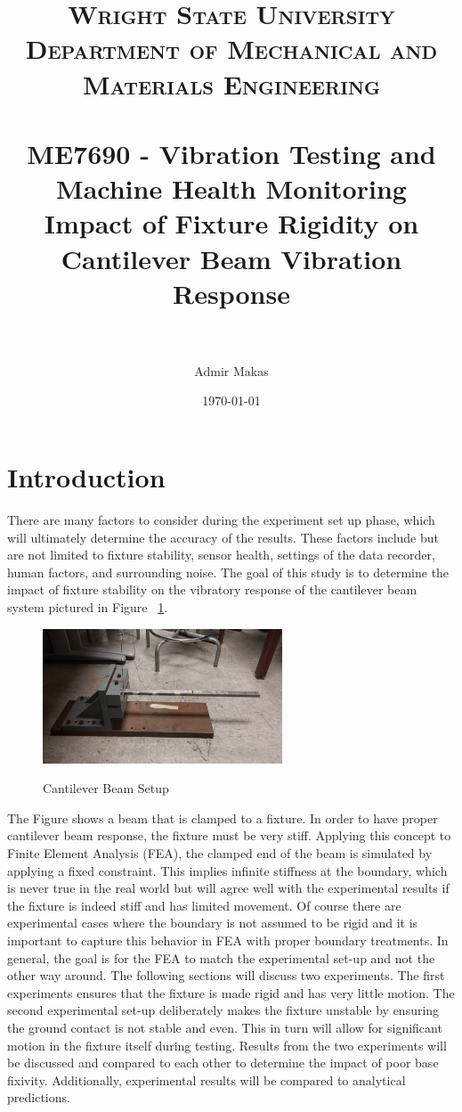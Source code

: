 \documentclass[paper=a4, fontsize=12pt]{scrartcl} %
\title{	
\normalfont \normalsize 
\textsc{Wright State University\\ Department of Mechanical and Materials Engineering} \\ [25pt] %
\horrule{0.5pt} \\[0.4cm] %
\large ME7690 - Vibration Testing and Machine Health Monitoring \\ %
\huge Impact of Fixture Rigidity on Cantilever Beam Vibration Response\\
\horrule{2pt} \\[0.4cm] %
}
\author{Admir Makas} %
\date{\normalsize\today} %
\begin{document}
\maketitle %

\section*{Introduction}
There are many factors to consider during the experiment set up phase, which will ultimately determine the accuracy of the results. These factors include but are not limited to fixture stability, sensor health, settings of the data recorder, human factors, and surrounding noise. The goal of this study is to determine the impact of fixture stability on the vibratory response of the cantilever beam system pictured in Figure ~\ref{fig:beamSideProfile}.
%
	\begin{figure}[H]
		\centering
		{
		\includegraphics[height=4.0cm]{BeamSideProfile.jpg}
		\label{fig:beamSideProfile}
		}
		\caption{Cantilever Beam Setup}
	\end{figure}
%
The Figure shows a beam that is clamped to a fixture. In order to have proper cantilever beam response, the fixture must be very stiff. Applying this concept to Finite Element Analysis (FEA), the clamped end of the beam is simulated by applying a fixed constraint. This implies infinite stiffness at the boundary, which is never true in the real world but will agree well with the experimental results if the fixture is indeed stiff and has limited movement. Of course there are experimental cases where the boundary is not assumed to be rigid and it is important to capture this behavior in FEA with proper boundary treatments. In general, the goal is for the FEA to match the experimental set-up and not the other way around.
%
The following sections will discuss two experiments. The first experiments ensures that the fixture is made rigid and has very little motion. The second experimental set-up deliberately makes the fixture unstable by ensuring the ground contact is not stable and even. This in turn will allow for significant motion in the fixture itself during testing. Results from the two experiments will be discussed and compared to each other to determine the impact of poor base fixivity. Additionally, experimental results will be compared to analytical predictions.
%
%
\end{document}
